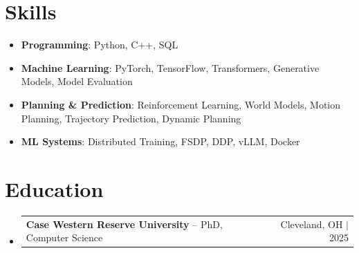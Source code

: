 \documentclass[letterpaper,13pt]{article}
\makeatletter
\newcommand{\resumeProjectHeading}[2]{
    \item
    \begin{tabular*}{\textwidth}{l@{\extracolsep{\fill}}r}
      \small#1 & #2 \\
    \end{tabular*}\vspace{-4pt}
}
\newcommand{\resumeSubHeadingListStart}{\begin{itemize}[leftmargin=0in, label={}]}
\newcommand{\resumeSubHeadingListEnd}{\end{itemize}}
\makeatother
\begin{document}
\section{Skills}
\vspace{0.02cm}
\begin{itemize}[leftmargin=0.15in, label={}, itemsep=2pt, topsep=1pt]
  \item \textbf{Programming}: Python, C++, SQL
  \item \textbf{Machine Learning}: PyTorch, TensorFlow, Transformers, Generative Models, Model Evaluation
  \item \textbf{Planning \& Prediction}: Reinforcement Learning, World Models, Motion Planning, Trajectory Prediction, Dynamic Planning
  \item \textbf{ML Systems}: Distributed Training, FSDP, DDP, vLLM, Docker
\end{itemize}
\vspace{0.02cm}

\section{Education}
\resumeSubHeadingListStart
  \resumeProjectHeading{\textbf{Case Western Reserve University} -- PhD, Computer Science}{Cleveland, OH $|$ 2025}
\resumeSubHeadingListEnd
\end{document}
